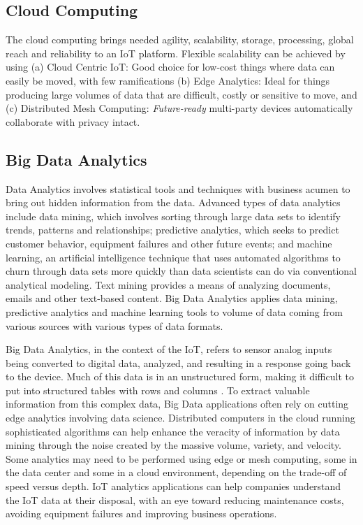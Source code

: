\documentclass[sigconf]{acmart}
\begin{document}
	\subsection{Cloud Computing}
	The cloud computing brings needed agility, scalability, storage, processing, global reach and reliability to an IoT platform. Flexible scalability can be achieved by using (a) Cloud Centric IoT: Good choice for low-cost things where data can easily be moved, with few ramifications (b) Edge Analytics: Ideal for things producing large volumes of data that are difficult, costly or sensitive to move, and (c) Distributed Mesh Computing: {\em Future-ready} multi-party devices automatically collaborate with privacy intact\cite{hp}. 
	
	\subsection{Big Data Analytics}
	Data Analytics involves statistical tools and techniques with business acumen to bring out hidden information from the data. Advanced types of data analytics include data mining, which involves sorting through large data sets to identify trends, patterns and relationships; predictive analytics, which seeks to predict customer behavior, equipment failures and other future events; and machine learning, an artificial intelligence technique that uses automated algorithms to churn through data sets more quickly than data scientists can do via conventional analytical modeling. Text mining provides a means of analyzing documents, emails and other text-based content. Big Data Analytics applies data mining, predictive analytics and machine learning tools to volume of data coming from various sources with various types of data formats. 
	
	Big Data Analytics, in the context of the IoT, refers to sensor analog inputs being converted to digital data, analyzed, and resulting in a response going back to the device. Much of this data is in an unstructured form, making it difficult to put into structured tables with rows and columns \cite{esg}. To extract valuable information from this complex data, Big Data applications often rely on cutting edge analytics involving data science. Distributed computers in the cloud running sophisticated algorithms can help enhance the veracity of information by data mining through the noise created by the massive volume, variety, and velocity. Some analytics may need to be performed using edge or mesh computing, some in the data center and some in a cloud environment, depending on the trade-off of speed versus depth. IoT analytics applications can help companies understand the IoT data at their disposal, with an eye toward reducing maintenance costs, avoiding equipment failures and improving business operations. 
	
\end{document}
